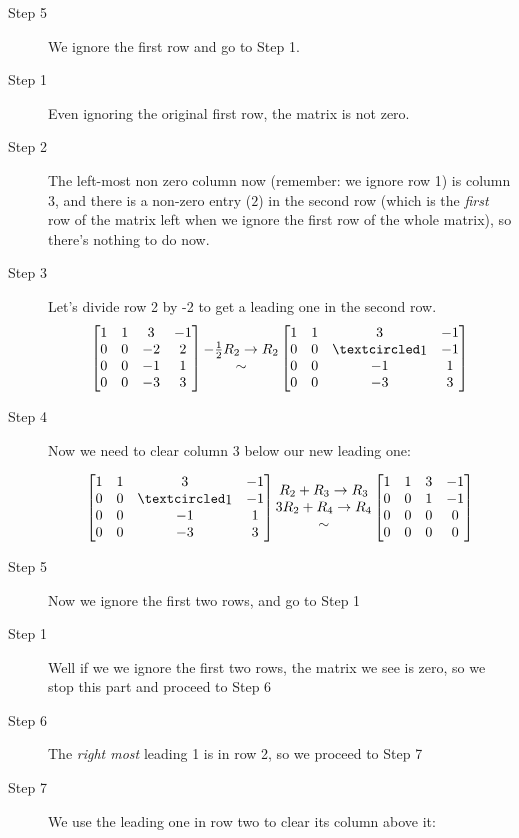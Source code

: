 \begin{myexample}
\begin{description}
\item[Step 5] We ignore the first row and go to Step 1.
\item[Step 1] Even ignoring the original first row, the matrix is not zero.
\item[Step 2] The left-most non zero column now (remember: we ignore row 1) is column 3, and there is a non-zero entry ($2$) in the second row (which is the {\it first} row of the matrix left when we ignore the first row of the whole matrix), so there's nothing to do now.
\item[Step 3] Let's divide row 2 by -2 to get a leading one in the second row.
$$\mat{1 & 1 & 3 & -1\\ 
0 & 0 & -2 & 2 \\
0 & 0 & -1 & 1 \\
0 & 0 & -3 & 3}
\begin{matrix} -\frac{1}{2} R_2\to R_2 \\ \sim \end{matrix} 
\mat{ 
1 & 1 & 3 & -1\\ 
0 & 0 & \pivot & -1 \\
0 & 0 & -1 & 1 \\
0 & 0 & -3 & 3}$$  

\item[Step 4] Now we need to clear column 3 below our new leading one: 

$$\mat{
1 & 1 & 3 & -1\\ 
0 & 0 & \pivot & -1 \\
0 & 0 & -1 & 1 \\
0 & 0 & -3 & 3}
\begin{matrix}  R_2+ R_3\to R_3 \\ 3R_2+ R_4\to R_4 \\\sim \end{matrix} 
\mat{ 
1 & 1 & 3 & -1\\ 
0 & 0 & 1 & -1 \\
0 & 0 & 0 & 0 \\
0 & 0 & 0 & 0}$$
\item[Step 5] Now we ignore the first two rows, and go to Step 1

\item[Step 1] Well if we we ignore the first two rows, the matrix we see is zero, so we stop this part and proceed to Step 6

\item[Step 6] The {\it right most} leading 1 is in row 2, so we proceed to Step 7

\item[Step 7] We use the leading one in row two to clear its column above it:  



\end{description}
\end{myexample}
